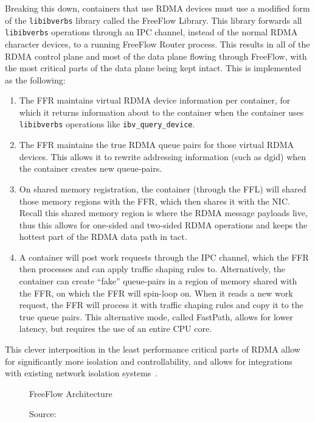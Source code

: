 \documentclass[12pt,titlepage]{article}
\begin{document}
Breaking this down, containers that use RDMA devices must use a modified form of the \texttt{libibverbs} library called the FreeFlow Library.
This library forwards all \texttt{libibverbs} operations through an IPC channel, instead of the normal RDMA character devices, to a running FreeFlow Router process.
This results in all of the RDMA control plane and most of the data plane flowing through FreeFlow, with the most critical parts of the data plane being kept intact.
This is implemented as the following:
\begin{enumerate}[nolistsep]
	\item The FFR maintains virtual RDMA device information per container, for which it returns information about to the container when the container uses \texttt{libibverbs} operations like \texttt{ibv\_query\_device}.
	\item The FFR maintains the true RDMA queue pairs for those virtual RDMA devices. This allows it to rewrite addressing information (such as dgid) when the container creates new queue-pairs.
	\item On shared memory registration, the container (through the FFL) will shared those memory regions with the FFR, which then shares it with the NIC\@. Recall this shared memory region is where the RDMA message payloads live, thus this allows for one-sided and two-sided RDMA operations and keeps the hottest part of the RDMA data path in tact.
	\item A container will post work requests through the IPC channel, which the FFR then processes and can apply traffic shaping rules to. Alternatively, the container can create ``fake'' queue-pairs in a region of memory shared with the FFR, on which the FFR will spin-loop on. When it reads a new work request, the FFR will process it with traffic shaping rules and copy it to the true queue pairs. This alternative mode, called FastPath, allows for lower latency, but requires the use of an entire CPU core.
\end{enumerate}
This clever interposition in the least performance critical parts of RDMA allow for significantly more isolation and controllability, and allows for integrations with existing network isolation systems~\cite{kim2019freeflow}.

\begin{figure}
	\centering
	\caption{FreeFlow Architecture}
	\caption*{Source:~\cite{kim2019freeflow}}
\end{figure}
\end{document}
